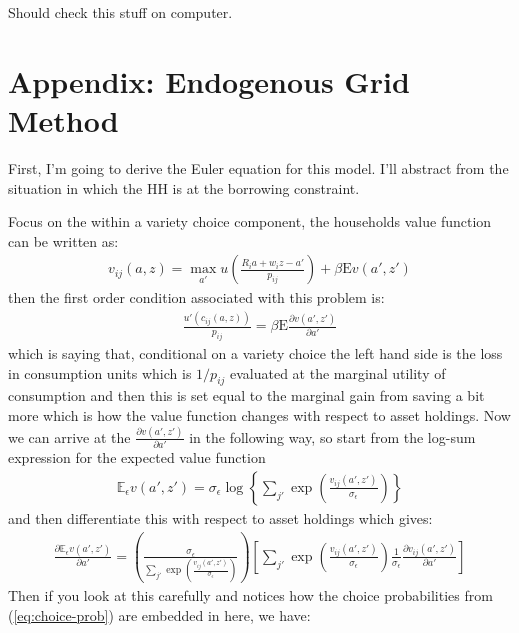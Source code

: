 \documentclass[12pt,pdftex]{article}
\begin{document}
\begin{onehalfspacing}
Should check this stuff on computer.





\newpage


\section{Appendix: Endogenous Grid Method}

First, I'm going to derive the Euler equation for this model. I'll abstract from the situation in which the HH is at the borrowing constraint.

Focus on the within a variety choice component, the households value function can be written as:
\begin{align}
v_{ij}(a, z) = \max_{a'} u \left( \frac{R_i a + w_i z - a'}{p_{ij}} \right) + \beta  \mathrm{E} v(a', z')
\end{align}
then the first order condition associated with this problem is:
\begin{align}
\frac{u'(c_{ij}(a, z))}{p_{ij}} = \beta \mathrm{E} \frac{\partial v(a', z')}{\partial a'}
\end{align}
which is saying that, conditional on a variety choice the left hand side is the loss in consumption units which is $1 / p_{ij}$ evaluated at the marginal utility of consumption and then this is set equal to the marginal gain from saving a bit more which is how the value function changes with respect to asset holdings. Now we can arrive at the $\frac{\partial v(a', z')}{\partial a'}$ in the following way, so start from the log-sum expression for the expected value function
\begin{align}
\mathbb{E}_{\epsilon} v(a', z') =  \sigma_{\epsilon} \log \left\{ \sum_{j'} \exp \left( \frac{  v_{ij}(a', z')}{\sigma_{\epsilon}} \right) \right\}
\end{align}
and then differentiate this with respect to asset holdings which gives:
\begin{align}
\frac{\partial \mathbb{E}_{\epsilon} v(a', z')}{\partial a'} = \left( \frac{\sigma_{\epsilon}}{\sum_{j'} \exp \left( \frac{  v_{ij}(a', z')}{\sigma_{\epsilon}}\right)} \right)
\left[ \sum_{j'} \exp \left( \frac{  v_{ij}(a', z')}{\sigma_{\epsilon}}\right) \frac{1}{\sigma_{\epsilon}} \frac{\partial v_{ij}(a', z')}{\partial a'}  \right]
\end{align}
Then if you look at this carefully and notices how the choice probabilities from (\ref{eq:choice-prob}) are embedded in here, we have:
\begin{align}

\end{align}
\end{onehalfspacing}
\end{document}
